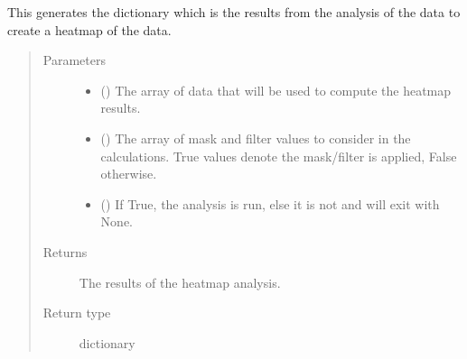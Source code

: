 \documentclass[letterpaper,10pt,english]{sphinxmanual}
\begin{document}
\begin{fulllineitems}
\label{\detokenize{docstrings/ifa_smeargle.analysis.heatmap:ifa_smeargle.analysis.heatmap.analysis_heatmap}}
This generates the dictionary which is the results from the
analysis of the data to create a heat\sphinxhyphen{}map of the data.
\begin{quote}\begin{description}
\item[{Parameters}] \leavevmode\begin{itemize}
\item {} 
 () \textendash{} The array of data that will be used to compute the heat\sphinxhyphen{}map
results.

\item {} 
 (\sphinxstyleliteralemphasis{\sphinxupquote{ (}}\sphinxstyleliteralemphasis{\sphinxupquote{)}}) \textendash{} The array of mask and filter values to consider in the
calculations. True values denote the mask/filter is applied,
False otherwise.

\item {} 
 (\sphinxstyleliteralemphasis{\sphinxupquote{ (}}\sphinxstyleliteralemphasis{\sphinxupquote{)}}) \textendash{} If True, the analysis is run, else it is not and will exit
with None.

\end{itemize}

\item[{Returns}] \leavevmode
{} \textendash{} The results of the heat\sphinxhyphen{}map analysis.

\item[{Return type}] \leavevmode
dictionary

\end{description}\end{quote}

\end{fulllineitems}
\end{document}
